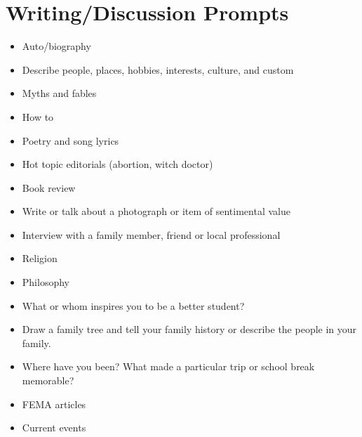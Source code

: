 \section{Writing/Discussion Prompts}
\begin{itemize}
\item Auto/biography 
\item Describe people, places, hobbies, interests, culture, and custom 
\item Myths and fables  
\item How to  
\item Poetry and song lyrics  
\item Hot topic editorials (abortion, witch doctor)  
\item Book review  
\item Write or talk about a photograph or item of sentimental value  
\item Interview with a family member, friend or local professional  
\item Religion  
\item Philosophy  
\item What or whom inspires you to be a better student?  
\item Draw a family tree and tell your family history or describe the people
in your family. 
\item Where have you been? What made a particular trip or school break memorable? 
\item FEMA articles  
\item Current events \end{itemize}


